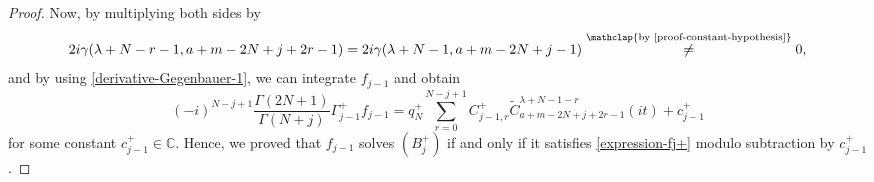 \documentclass[12pt, pdflatex, a4paper]{article}
\theoremstyle{plain}
\theoremstyle{definition}
\def\C{{\mathbb C}}
\def\Geg{\widetilde{C}}
\begin{document}
\begin{proof}
Now, by multiplying both sides by
\begin{equation*}
2i\gamma(\lambda+N-r-1, a+m-2N+j+2r-1) = 2i\gamma(\lambda+N-1, a+m-2N+j-1) \stackrel{\mathclap{\scriptsize\mbox{by } \eqref{proof-constant-hypothesis}}}{\neq} 0,
\end{equation*}
and by using \eqref{derivative-Gegenbauer-1}, we can integrate $f_{j-1}$ and obtain
\begin{equation}\label{proof-expresion-fj-1}
(-i)^{N-j+1}\frac{\Gamma(2N+1)}{\Gamma(N+j)}\Gamma_{j-1}^+f_{j-1} = q_N^+\sum_{r=0}^{N-j+1}C_{j-1, r}^+\Geg_{a+m-2N+j+2r-1}^{\lambda+N-1-r}(it) + c_{j-1}^+
\end{equation}
for some constant $c_{j-1}^+ \in \C$. Hence, we proved that $f_{j-1}$ solves $(B_j^+)$ if and only if it satisfies \eqref{expression-fj+} modulo subtraction by $c_{j-1}^+$.


\end{proof}
\end{document}

